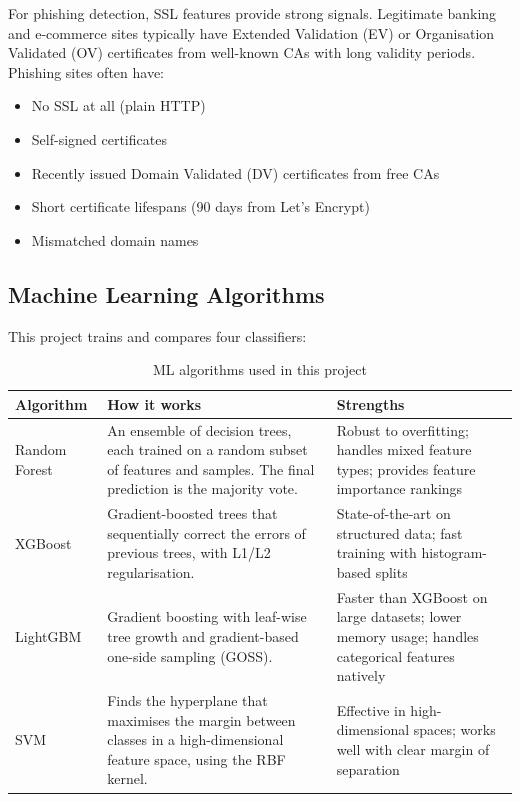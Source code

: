 \documentclass[11pt,a4paper]{article}
\begin{document}
For phishing detection, SSL features provide strong signals. Legitimate banking and e-commerce sites typically have Extended Validation (EV) or Organisation Validated (OV) certificates from well-known CAs with long validity periods. Phishing sites often have:
\begin{itemize}
  \item No SSL at all (plain HTTP)
  \item Self-signed certificates
  \item Recently issued Domain Validated (DV) certificates from free CAs
  \item Short certificate lifespans (90 days from Let's Encrypt)
  \item Mismatched domain names
\end{itemize}

\subsection{Machine Learning Algorithms}

This project trains and compares four classifiers:

\begin{table}[H]
\centering
\small
\begin{tabularx}{\textwidth}{@{}p{2.5cm}Lp{3.2cm}@{}}
\toprule
\textbf{Algorithm} & \textbf{How it works} & \textbf{Strengths} \\ \midrule
Random Forest~\cite{breiman2001} & An ensemble of decision trees, each trained on a random subset of features and samples. The final prediction is the majority vote. & Robust to overfitting; handles mixed feature types; provides feature importance rankings \\
XGBoost~\cite{chen2016} & Gradient-boosted trees that sequentially correct the errors of previous trees, with L1/L2 regularisation. & State-of-the-art on structured data; fast training with histogram-based splits \\
LightGBM~\cite{ke2017} & Gradient boosting with leaf-wise tree growth and gradient-based one-side sampling (GOSS). & Faster than XGBoost on large datasets; lower memory usage; handles categorical features natively \\
SVM~\cite{cortes1995} & Finds the hyperplane that maximises the margin between classes in a high-dimensional feature space, using the RBF kernel. & Effective in high-dimensional spaces; works well with clear margin of separation \\ \bottomrule
\end{tabularx}
\caption{ML algorithms used in this project}
\end{table}
\end{document}
